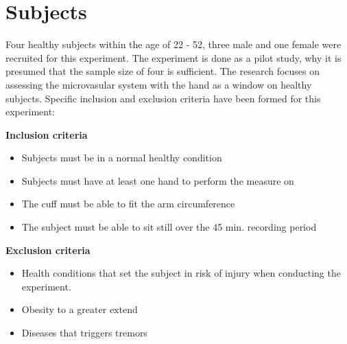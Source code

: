 \section{Subjects}

Four healthy subjects within the age of 22 - 52, three male and one female were recruited for this experiment. The experiment is done as a pilot study, why it is presumed that the sample size of four is sufficient. The research focuses on assessing the microvasular system with the hand as a window on healthy subjects. Specific inclusion and exclusion criteria have been formed for this experiment:

\textbf{Inclusion criteria}
\begin{itemize}[noitemsep]
	\item Subjects must be in a normal healthy condition 
	\item Subjects must have at least one hand to perform the measure on
	\item The cuff must be able to fit the arm circumference 
	\item The subject must be able to sit still over the 45 min. recording period 
\end{itemize}

\textbf{Exclusion criteria}
\begin{itemize}[noitemsep]
	\item Health conditions that set the subject in risk of injury when conducting the experiment.
	
	\item Obesity to a greater extend
	\item Diseases that triggers tremors   
\end{itemize} 
